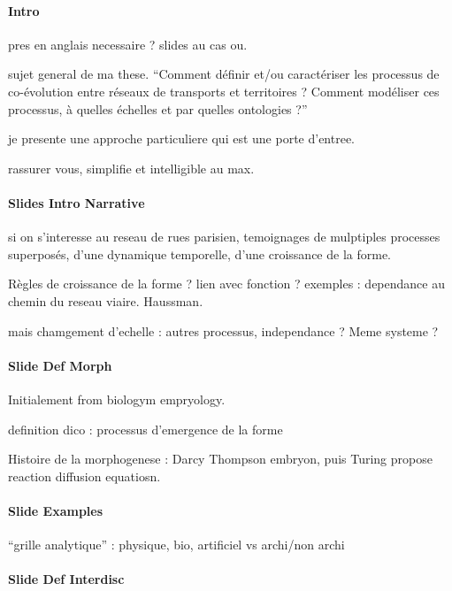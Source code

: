 \documentclass[11pt]{article}
\begin{document}
\paragraph{Intro}

pres en anglais necessaire ? slides au cas ou.

sujet general de ma these. ``Comment définir et/ou caractériser les processus de co-évolution entre réseaux de transports et territoires ? Comment modéliser ces processus, à quelles échelles et par quelles ontologies ?''

je presente une approche particuliere qui est une porte d'entree.

rassurer vous, simplifie et intelligible au max.



\paragraph{Slides Intro Narrative}

si on s'interesse au reseau de rues parisien, temoignages de mulptiples processes superposés, d'une dynamique temporelle, d'une croissance de la forme.

Règles de croissance de la forme ? lien avec fonction ? exemples : dependance au chemin du reseau viaire. Haussman.

mais chamgement d'echelle : autres processus, independance ? Meme systeme ?





\paragraph{Slide Def Morph}

Initialement from biologym empryology.

definition dico : processus d'emergence de la forme

Histoire de la morphogenese : Darcy Thompson embryon, puis Turing propose reaction diffusion equatiosn.

\paragraph{Slide Examples}

``grille analytique'' : physique, bio, artificiel vs archi/non archi

\paragraph{Slide Def Interdisc}
\end{document}
